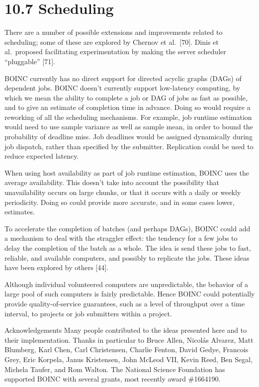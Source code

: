 \documentclass[
]{article}
\begin{document}
\section{10.7 Scheduling}\label{scheduling-1}

There are a number of possible extensions and improvements related to
scheduling; some of these are explored by Chernov et al.~{[}70{]}. Dinis
et al.~proposed facilitating experimentation by making the server
scheduler ``pluggable'' {[}71{]}.

BOINC currently has no direct support for directed acyclic graphs (DAGs)
of dependent jobs. BOINC doesn't currently support low-latency
computing, by which we mean the ability to complete a job or DAG of jobs
as fast as possible, and to give an estimate of completion time in
advance. Doing so would require a reworking of all the scheduling
mechanisms. For example, job runtime estimation would need to use sample
variance as well as sample mean, in order to bound the probability of
deadline miss. Job deadlines would be assigned dynamically during job
dispatch, rather than specified by the submitter. Replication could be
used to reduce expected latency.

When using host availability as part of job runtime estimation, BOINC
uses the average availability. This doesn't take into account the
possibility that unavailability occurs on large chunks, or that it
occurs with a daily or weekly periodicity. Doing so could provide more
accurate, and in some cases lower, estimates.

To accelerate the completion of batches (and perhaps DAGs), BOINC could
add a mechanism to deal with the straggler effect: the tendency for a
few jobs to delay the completion of the batch as a whole. The idea is
send these jobs to fast, reliable, and available computers, and possibly
to replicate the jobs. These ideas have been explored by others
{[}44{]}.

Although individual volunteered computers are unpredictable, the
behavior of a large pool of such computers is fairly predictable. Hence
BOINC could potentially provide quality-of-service guarantees, such as a
level of throughput over a time interval, to projects or job submitters
within a project.

Acknowledgements Many people contributed to the ideas presented here and
to their implementation. Thanks in particular to Bruce Allen, Nicolás
Alvarez, Matt Blumberg, Karl Chen, Carl Christensen, Charlie Fenton,
David Gedye, Francois Grey, Eric Korpela, Janus Kristensen, John McLeod
VII, Kevin Reed, Ben Segal, Michela Taufer, and Rom Walton. The National
Science Foundation has supported BOINC with several grants, most
recently award \#1664190.
\end{document}
